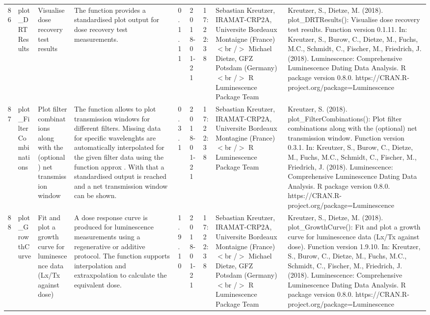 \begin{table}[ht]
\begin{tabular}{rllllllll}
 \\ 
  86 & plot\_DRTResults & Visualise dose recovery test results & The function provides a standardised plot output for dose recovery test measurements. & 0.1.11 & 2018-01-21 & 17:22:38
 & Sebastian Kreutzer, IRAMAT-CRP2A, Universite Bordeaux Montaigne (France) $<$br /$>$ Michael Dietze, GFZ Potsdam (Germany)$<$br /$>$  R Luminescence Package Team & Kreutzer, S., Dietze, M. (2018). plot\_DRTResults(): Visualise dose recovery test results. Function version 0.1.11. In: Kreutzer, S., Burow, C., Dietze, M., Fuchs, M.C., Schmidt, C., Fischer, M., Friedrich, J. (2018). Luminescence: Comprehensive Luminescence Dating Data Analysis. R package version 0.8.0. https://CRAN.R-project.org/package=Luminescence
 \\ 
  87 & plot\_FilterCombinations & Plot filter combinations along with the (optional) net transmission window & The function allows to plot transmission windows for different filters. Missing data for specific wavelenghts are automatically interpolated for the given filter data using the function  approx . With that a standardised output is reached and a net transmission window can be shown. & 0.3.1 & 2018-01-21 & 17:22:38
 & Sebastian Kreutzer, IRAMAT-CRP2A, Universite Bordeaux Montagine (France)$<$br /$>$  R Luminescence Package Team & Kreutzer, S. (2018). plot\_FilterCombinations(): Plot filter combinations along with the (optional) net transmission window. Function version 0.3.1. In: Kreutzer, S., Burow, C., Dietze, M., Fuchs, M.C., Schmidt, C., Fischer, M., Friedrich, J. (2018). Luminescence: Comprehensive Luminescence Dating Data Analysis. R package version 0.8.0. https://CRAN.R-project.org/package=Luminescence
 \\ 
  88 & plot\_GrowthCurve & Fit and plot a growth curve for luminescence data (Lx/Tx against dose) & A dose response curve is produced for luminescence measurements using a regenerative or additive protocol. The function supports interpolation and extraxpolation to calculate the equivalent dose. & 1.9.10 & 2018-01-21 & 17:22:38
 & Sebastian Kreutzer, IRAMAT-CRP2A, Universite Bordeaux Montaigne (France) $<$br /$>$ Michael Dietze, GFZ Potsdam (Germany)$<$br /$>$  R Luminescence Package Team & Kreutzer, S., Dietze, M. (2018). plot\_GrowthCurve(): Fit and plot a growth curve for luminescence data (Lx/Tx against dose). Function version 1.9.10. In: Kreutzer, S., Burow, C., Dietze, M., Fuchs, M.C., Schmidt, C., Fischer, M., Friedrich, J. (2018). Luminescence: Comprehensive Luminescence Dating Data Analysis. R package version 0.8.0. https://CRAN.R-project.org/package=Luminescence

\end{tabular}
\end{table}
